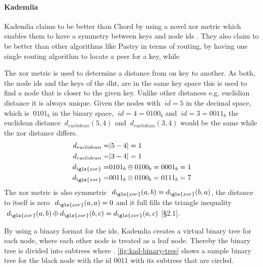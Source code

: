 \paragraph{Kademlia}\label{par:kademlia}
Kademlia claims to be better than Chord by using a novel \gls{xor} metric which enables them to have a symmetry between keys and node ids \cite[\S1]{kademlia}. They also claim to be better than other algorithms like Pastry in terms of routing, by having one single routing algorithm to locate a peer for a key, while \cite[\S1]{kademlia}

The \gls{xor} metric is used to determine a distance from on key to another. As both, the node ids and the keys of the \gls{dht}, are in the same key space this is used to find a node that is closer to the given key. Unlike other distances e.g. euclidian distance it is always unique.
Given the nodes with $\ id = 5 $ in the decimal space, which is  $\ 0101_{b} $ in the binary space, $\ id = 4 = 0100_{b} $ and $\ id = 3 = 0011_{b} $ the euclidean distance $\ d_{euclidean}(5,4) $ and $\ d_{euclidean}(3,4) $ would be the same while the xor distance differs.
\begin{equation}
\begin{aligned}  
    d_ {euclidean} = & | 5-4 | = 1\\
    d_ {euclidean} = & | 3-4 | = 1\\
    d_ {\gls{xor}} = & 0101_{b} \oplus 0100_{b} = 0001_{b} = 1\\
    d_ {\gls{xor}} = & 0011_{b} \oplus 0100_{b} = 0111_{b} = 7\\
  \end{aligned}  
\end{equation}
The \gls{xor} metric is also symmetric $\ d_{\gls{xor}}(a,b) = d_{\gls{xor}}(b,a) $, the distance to itself is zero $\ d_{\gls{xor}}(a,a) = 0 $ and it full fills the triangle inequality $\ d_{\gls{xor}}(a,b) \oplus d_{\gls{xor}}(b,c) = d_{\gls{xor}}(a,c) $ \cite{kademlia}[\S2.1].

By using a binary format for the ids, Kademlia creates a virtual binary tree for each node, where each other node is treated as a leaf node. Thereby the binary tree is divided into subtrees where  \cite[\S2]{kademlia}.
\vref{fig:kad-binary-tree} shows a sample binary tree for the black node with the id 0011 with its subtrees that are circled.

